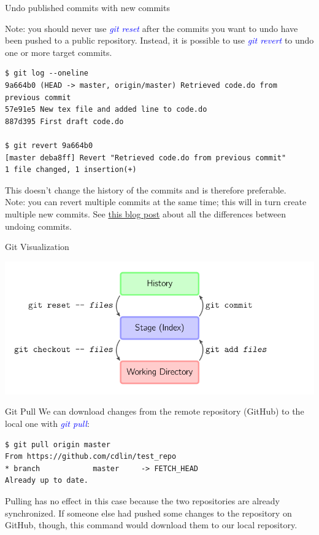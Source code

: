 \documentclass[11pt]{beamer}
\begin{document}
\begin{frame}[fragile]{Undo published commits with new commits}

Note: you should never use \textcolor{blue}{\emph{git reset}} after the commits you want to undo have been pushed to a public repository. Instead, it is possible to use \textcolor{blue}{\emph{git revert}} to undo one or more target commits.

\begin{lstlisting}
$ git log --oneline
9a664b0 (HEAD -> master, origin/master) Retrieved code.do from previous commit
57e91e5 New tex file and added line to code.do
887d395 First draft code.do

$ git revert 9a664b0
[master deba8ff] Revert "Retrieved code.do from previous commit"
1 file changed, 1 insertion(+)
\end{lstlisting}

This doesn't change the history of the commits and is therefore preferable.\\
\medskip
Note: you can revert multiple commits at the same time; this will in turn create multiple new commits.
See \href{https://github.com/blog/2019-how-to-undo-almost-anything-with-git}{this blog post} about all the differences between undoing commits.
\end{frame}
\begin{frame}{Git Visualization}
\begin{center}
	\includegraphics[width=1.0\textwidth]{./auxfiles/basic-usage.png}
\end{center}
\end{frame}



\begin{frame}[fragile]{Git Pull}
We can download changes from the remote repository (GitHub) to the local one with \textcolor{blue}{\emph{git pull}}:

\begin{lstlisting}
$ git pull origin master
From https://github.com/cdlin/test_repo
* branch            master     -> FETCH_HEAD
Already up to date.
\end{lstlisting}

Pulling has no effect in this case because the two repositories are already synchronized. If someone else had pushed some changes to the repository on GitHub, though, this command would download them to our local repository.\\

\end{frame}
\end{document}
